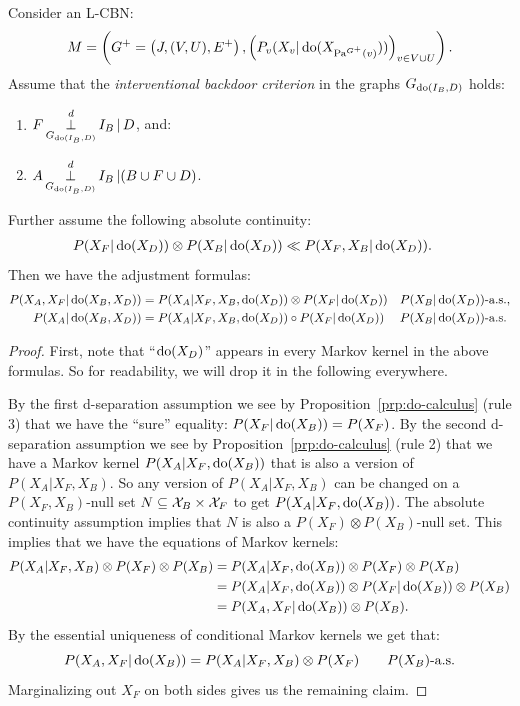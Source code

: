 \begin{Cor}
    \label{cor:backdoor-int}
    Consider an L-CBN:
        \[M= \left ( G^+=\left ( J,(V,U),E^+ \right ), \left ( P_v ( X_v|\operatorname{do}( X_{\mathrm{Pa}^{G^+}(v)})) \right )_{v \in V \cup U} \right ).\]
  Assume that the \emph{interventional backdoor criterion} in the graphs $G_{\operatorname{do}(I_B,D)}$ holds:
\begin{enumerate}
    \item $\displaystyle F \operatorname*{\perp}^d_{G_{\operatorname{do}(I_B,D)}} I_B  \operatorname*{|} D$, and:
    \item $\displaystyle A \operatorname*{\perp}^d_{G_{\operatorname{do}(I_B,D)}} I_B  \operatorname*{|} (B \cup F \cup D)$.
\end{enumerate}
    Further assume the following absolute continuity:
  \begin{align*}
      P(X_F|\operatorname{do}(X_D)) \otimes P(X_B|\operatorname{do}(X_D)) &\ll  P(X_F,X_B|\operatorname{do}(X_D)).
  \end{align*}
Then we have the adjustment formulas: 
\begin{align*}
    P(X_A,X_F|\operatorname{do}(X_B,X_D)) &= P(X_A|X_F,X_B,\operatorname{do}(X_D)) \otimes P(X_F|\operatorname{do}(X_D)) && P(X_B|\operatorname{do}(X_D))\text{-a.s.}, \\
    P(X_A|\operatorname{do}(X_B,X_D)) &= P(X_A|X_F,X_B,\operatorname{do}(X_D)) \circ P(X_F|\operatorname{do}(X_D)) && P(X_B|\operatorname{do}(X_D))\text{-a.s.}
\end{align*}
\begin{proof}
 First, note that ``$\operatorname{do}(X_D)$'' appears in every Markov kernel in the above formulas. So for readability, we will drop it in the following everywhere.

By the first d-separation assumption we see by Proposition~\ref{prp:do-calculus} (rule 3) that we have the ``sure'' equality: $P(X_F|\operatorname{do}(X_B)) = P(X_F)$.
By the second d-separation assumption we see by Proposition~\ref{prp:do-calculus} (rule 2) that we have a Markov kernel $P(X_A|X_F,\operatorname{do}(X_B))$ that is also a version of $P(X_A|X_F,X_B)$.
So any version of $P(X_A|X_F,X_B)$ can be changed on a $P(X_F,X_B)$-null set $N \subseteq \mathcal{X}_B \times \mathcal{X}_F$ to get $P(X_A|X_F,\operatorname{do}(X_B))$.
The absolute continuity assumption implies that $N$ is also a $P(X_F) \otimes P(X_B)$-null set.
This implies that we have the equations of Markov kernels:
\begin{align*}
        P(X_A|X_F,X_B) \otimes P(X_F) \otimes P(X_B) 
        &= P(X_A|X_F,\operatorname{do}(X_B)) \otimes P(X_F) \otimes P(X_B) \\
        &= P(X_A|X_F,\operatorname{do}(X_B)) \otimes P(X_F|\operatorname{do}(X_B)) \otimes P(X_B) \\
        &= P(X_A,X_F|\operatorname{do}(X_B)) \otimes P(X_B).
\end{align*}
 By the essential uniqueness of conditional Markov kernels we get that:
\[ P(X_A,X_F|\operatorname{do}(X_B)) = P(X_A|X_F,X_B) \otimes P(X_F)  \qquad P(X_B)\text{-a.s.} \]
Marginalizing out $X_F$ on both sides gives us the remaining claim.
\end{proof}
\end{Cor}


